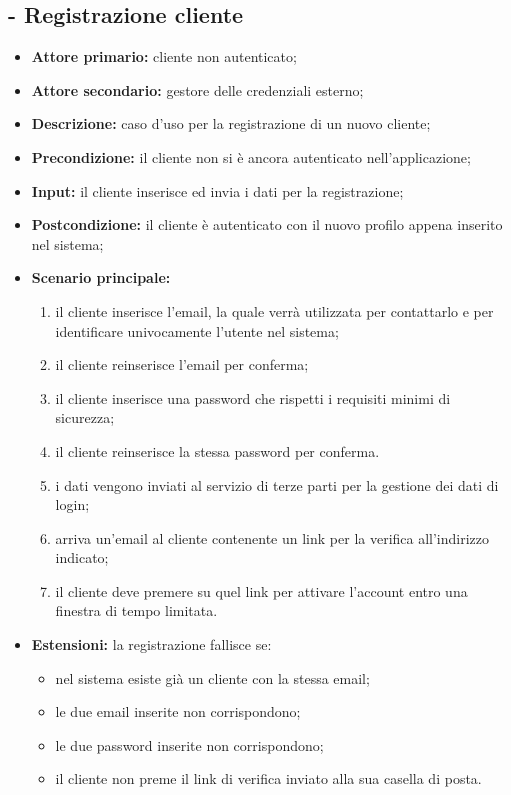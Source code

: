 \subsection{ - Registrazione cliente}
\begin{itemize}
    \item \textbf{Attore primario:} cliente non autenticato;
    \item \textbf{Attore secondario:} gestore delle credenziali esterno;
    \item \textbf{Descrizione:} caso d'uso per la registrazione di un nuovo cliente;
    \item \textbf{Precondizione:} il cliente non si è ancora autenticato nell'applicazione;
    \item \textbf{Input:} il cliente inserisce ed invia i dati per la registrazione;
    \item \textbf{Postcondizione:} il cliente è autenticato con il nuovo profilo appena inserito nel sistema;
    \item \textbf{Scenario principale:}
          \begin{enumerate}
              \item il cliente inserisce l'email, la quale verrà utilizzata per contattarlo e per identificare univocamente l'utente nel sistema;
              \item il cliente reinserisce l'email per conferma;
              \item il cliente inserisce una password che rispetti i requisiti minimi di sicurezza;
              \item il cliente reinserisce la stessa password per conferma.
              \item i dati vengono inviati al servizio di terze parti per la gestione dei dati di login;
              \item arriva un'email al cliente contenente un link per la verifica all'indirizzo indicato;
              \item il cliente deve premere su quel link per attivare l'account entro una finestra di tempo limitata.
          \end{enumerate}
    \item \textbf{Estensioni:} la registrazione fallisce se:
          \begin{itemize}
              \item nel sistema esiste già un cliente con la stessa email;
              \item le due email inserite non corrispondono;
              \item le due password inserite non corrispondono;
              \item il cliente non preme il link di verifica inviato alla sua casella di posta.
          \end{itemize}
\end{itemize}

